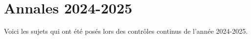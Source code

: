 









\tableofcontents

\newpage
{}  %


























\chapter{Annales 2024-2025}
Voici les sujets qui ont été posés lors des contrôles continus de l'année 2024-2025.








